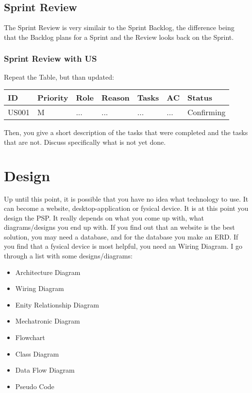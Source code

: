 \documentclass[10pt]{report}
\begin{document}
\newpage

\section{Sprint Review}

The Sprint Review is very similair to the Sprint Backlog, the difference being that the Backlog plans for a Sprint and the Review looks back on the Sprint.

\subsection{Sprint Review with US}

Repeat the Table, but than updated: 

\medskip
\begin{tabularx}{0.8\textwidth} { 
  | >{\raggedright\arraybackslash}X 
  | >{\centering\arraybackslash}X 
  | >{\raggedright\arraybackslash}X 
  | >{\raggedright\arraybackslash}X 
  | >{\raggedright\arraybackslash}X 
  | >{\raggedright\arraybackslash}X 
  | >{\raggedleft\arraybackslash}X | }
 \hline
 ID & Priority & Role & Reason & Tasks & AC & Status \\
 \hline
 US001 & M & ... & ... & ... & ... & Confirming \\
 \hline
\end{tabularx}
\medskip

\noindent Then, you give a short description of the tasks that were completed and the tasks that are not. Discuss specifically what is not yet done.

\newpage

\chapter{Design}

Up until this point, it is possible that you have no idea what technology to use. It can become a website, desktop-application or fysical device. It is at this point you design the PSP. It really depends on what you come up with, what diagrams/designs you end up with. If you find out that an website is the best solution, you may need a database, and for the database you make an ERD. If you find that a fysical device is most helpful, you need an Wiring Diagram. I go through a list with some designs/diagrams:

\begin{itemize}
	\item Architecture Diagram
	\item Wiring Diagram
	\item Enity Relationship Diagram
	\item Mechatronic Diagram
	\item Flowchart
	\item Class Diagram
	\item Data Flow Diagram
	\item Pseudo Code
\end{itemize}
\end{document}
